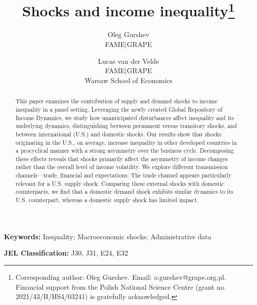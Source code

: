 \documentclass[12pt, a4paper]{article}
\title{Shocks and income inequality\thanks{Corresponding author: Oleg Gurshev. Email: o.gurshev@grape.org.pl.\\Financial support from the Polish National Science Centre (grant no. 2021/43/B/HS4/03241) is gratefully acknowledged.}}%
\author{
    Oleg Gurshev  \\ 
    \small{FAME$\mid$GRAPE} 
    \and 
    Lucas van der Velde \\ 
    \small{FAME$\mid$GRAPE} \\[-0.5em] 
    \small{Warsaw School of Economics}
}
\date{}
\begin{document}
\maketitle
\thispagestyle{empty}
\begin{abstract}
\noindent 
This paper examines the contribution of supply and demand shocks to income inequality in a panel setting. Leveraging the newly created Global Repository of Income Dynamics, we study how unanticipated disturbances affect inequality and its underlying dynamics, distinguishing between permanent versus transitory shocks, and between international (U.S.) and domestic shocks. Our results show that shocks originating in the U.S., on average, increase inequality in other developed countries in a procyclical manner with a strong asymmetry over the business cycle. Decomposing these effects reveals that shocks primarily affect the asymmetry of income changes rather than the overall level of income volatility. We explore different transmission channels—trade, financial and expectations. The trade channel appears particularly relevant for a U.S. supply shock. Comparing these external shocks with domestic counterparts, we find that a domestic demand shock exhibits similar dynamics to its U.S. counterpart, whereas a domestic supply shock has limited impact.
\end{abstract}

\bigskip
\hspace*{15pt}\textbf{Keywords:} Inequality; Macroeconomic shocks; Administrative data
 
\hspace*{15pt}\textbf{JEL Classification:} J30, J31, E24, E32
\clearpage

\end{document}
